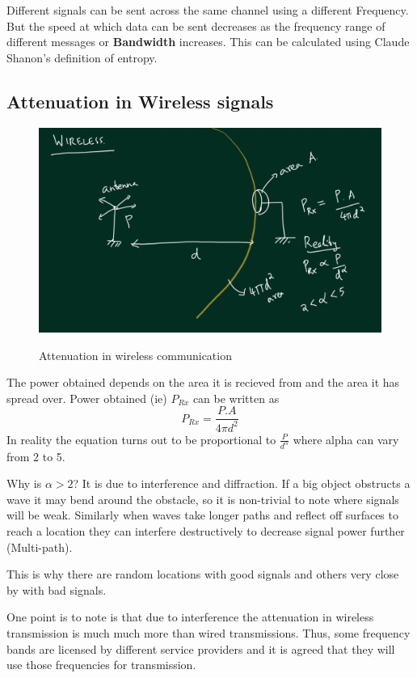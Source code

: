 \documentclass[12pt]{article}
\begin{document}
Different signals can be sent across the same channel using a different Frequency. But 
the speed at which data can be sent decreases as the frequency range of different messages or \textbf{Bandwidth} increases. 
This can be calculated using Claude Shanon's definition of entropy. 


\subsection{Attenuation in Wireless signals}
\begin{figure}[H]
    \centering
    \includegraphics[width = 15cm]{Diagrams/wireless_attenuation.png}
    \label{fig:wireless-attenuation}
    \caption{Attenuation in wireless communication}
\end{figure}

The power obtained depends on the area it is recieved from and the area it has spread over. 
Power obtained (ie) $P_{Rx}$ can be written as 
\[P_{Rx} = \frac{P.A}{4\pi d^2}\]
In reality the equation turns out to be proportional to $ \frac{P}{d^\alpha}$ where alpha 
can vary from 2 to 5. 

Why is $\alpha > 2$? It is due to interference and diffraction. If a big object 
obstructs a wave it may bend around the obstacle, so it is non-trivial to note where signals will be weak. Similarly when waves take longer paths 
and reflect off surfaces to reach a location they can interfere destructively to decrease signal power further (Multi-path). 

This is why there are random locations with good signals and others very close by with bad signals. 


One point is to note is that due to interference the attenuation in wireless transmission is much much more than wired transmissions. Thus,
some frequency bands are licensed by different service providers and it is agreed that they will use those frequencies for transmission. 
\end{document}
